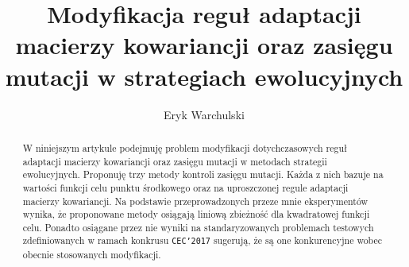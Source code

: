 
\title{Modyfikacja reguł adaptacji macierzy kowariancji oraz zasięgu mutacji w strategiach ewolucyjnych}
\author{Eryk Warchulski}

\maketitle
\begin{abstract}
  W niniejszym artykule podejmuję problem modyfikacji dotychczasowych reguł adaptacji macierzy kowariancji oraz zasięgu mutacji w metodach strategii ewolucyjnych.
  Proponuję trzy metody kontroli zasięgu mutacji. Każda z nich bazuje na wartości funkcji celu punktu środkowego oraz na uproszczonej regule adaptacji macierzy kowariancji.
  Na podstawie przeprowadzonych przeze mnie eksperymentów wynika, że proponowane metody osiągają liniową zbieżność dla kwadratowej funkcji celu. Ponadto osiągane przez nie wyniki na standaryzowanych problemach testowych zdefiniowanych w ramach konkrusu \texttt{CEC'2017} sugerują, że są one konkurencyjne wobec obecnie stosowanych modyfikacji. 
\end{abstract}







